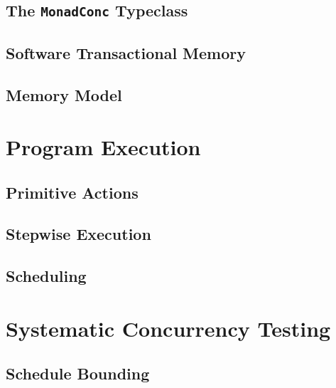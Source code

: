 \documentclass[openright, dottedtoc, headinclude, footinclude=true, a4paper, numbers=noenddot, fontsize=10pt]{scrreprt}
\begin{document}
  \subsection{The \texttt{MonadConc} Typeclass}
  \label{sec:abstraction-typeclass}
  

  \subsection{Software Transactional Memory}
  \label{sec:abstraction-stm}
  

  \subsection{Memory Model}
  \label{sec:abstraction-mem}
  

\section{Program Execution}
\label{chap:execution}


  \subsection{Primitive Actions}
  \label{sec:execution-primops}
  

  \subsection{Stepwise Execution}
  \label{sec:execution-stepwise}
  

  \subsection{Scheduling}
  \label{sec:execution-scheduling}
  

\section{Systematic Concurrency Testing}
\label{chap:sct}


  \subsection{Schedule Bounding}
  \label{sec:sct-bounding}
  
\end{document}
